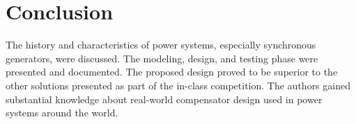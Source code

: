 \section{Conclusion}
The history and characteristics of power systems, especially synchronous generators, were discussed. The modeling, design, and testing phase were presented and documented. The proposed design proved to be superior to the other solutions presented as part of the in-class competition. The authors gained substantial knowledge about real-world compensator design used in power systems around the world.


